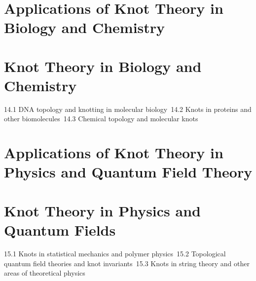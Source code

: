 \section{Applications of Knot Theory in Biology and Chemistry}
\section{Knot Theory in Biology and Chemistry}
14.1 DNA topology and knotting in molecular biology\
14.2 Knots in proteins and other biomolecules\
14.3 Chemical topology and molecular knots\
\section{Applications of Knot Theory in Physics and Quantum Field Theory}
\section{Knot Theory in Physics and Quantum Fields}
15.1 Knots in statistical mechanics and polymer physics\
15.2 Topological quantum field theories and knot invariants\
15.3 Knots in string theory and other areas of theoretical physics\
